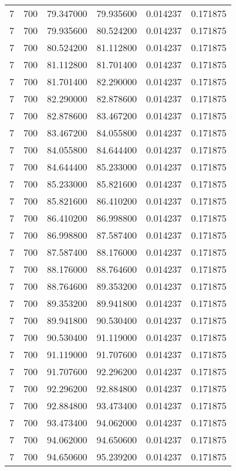 \begin{longtable}{rrrrrr}
7 & 700 & 79.347000 & 79.935600 & 0.014237 & 0.171875 \\
7 & 700 & 79.935600 & 80.524200 & 0.014237 & 0.171875 \\
7 & 700 & 80.524200 & 81.112800 & 0.014237 & 0.171875 \\
7 & 700 & 81.112800 & 81.701400 & 0.014237 & 0.171875 \\
7 & 700 & 81.701400 & 82.290000 & 0.014237 & 0.171875 \\
7 & 700 & 82.290000 & 82.878600 & 0.014237 & 0.171875 \\
7 & 700 & 82.878600 & 83.467200 & 0.014237 & 0.171875 \\
7 & 700 & 83.467200 & 84.055800 & 0.014237 & 0.171875 \\
7 & 700 & 84.055800 & 84.644400 & 0.014237 & 0.171875 \\
7 & 700 & 84.644400 & 85.233000 & 0.014237 & 0.171875 \\
7 & 700 & 85.233000 & 85.821600 & 0.014237 & 0.171875 \\
7 & 700 & 85.821600 & 86.410200 & 0.014237 & 0.171875 \\
7 & 700 & 86.410200 & 86.998800 & 0.014237 & 0.171875 \\
7 & 700 & 86.998800 & 87.587400 & 0.014237 & 0.171875 \\
7 & 700 & 87.587400 & 88.176000 & 0.014237 & 0.171875 \\
7 & 700 & 88.176000 & 88.764600 & 0.014237 & 0.171875 \\
7 & 700 & 88.764600 & 89.353200 & 0.014237 & 0.171875 \\
7 & 700 & 89.353200 & 89.941800 & 0.014237 & 0.171875 \\
7 & 700 & 89.941800 & 90.530400 & 0.014237 & 0.171875 \\
7 & 700 & 90.530400 & 91.119000 & 0.014237 & 0.171875 \\
7 & 700 & 91.119000 & 91.707600 & 0.014237 & 0.171875 \\
7 & 700 & 91.707600 & 92.296200 & 0.014237 & 0.171875 \\
7 & 700 & 92.296200 & 92.884800 & 0.014237 & 0.171875 \\
7 & 700 & 92.884800 & 93.473400 & 0.014237 & 0.171875 \\
7 & 700 & 93.473400 & 94.062000 & 0.014237 & 0.171875 \\
7 & 700 & 94.062000 & 94.650600 & 0.014237 & 0.171875 \\
7 & 700 & 94.650600 & 95.239200 & 0.014237 & 0.171875 \\

\end{longtable}
